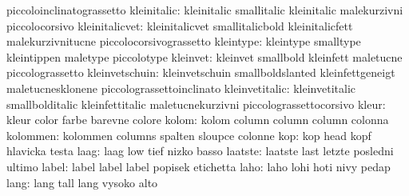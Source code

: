                            piccoloinclinatograssetto
              kleinitalic: kleinitalic               smallitalic
                           kleinitalic               malekurzivni
                           piccolocorsivo
           kleinitalicvet: kleinitalicvet            smallitalicbold
                           kleinitalicfett           malekurzivnitucne
                           piccolocorsivograssetto
                kleintype: kleintype                 smalltype
                           kleintippen               maletype
                           piccolotype               %
                 kleinvet: kleinvet                  smallbold
                           kleinfett                 maletucne
                           piccolograssetto
           kleinvetschuin: kleinvetschuin            smallboldslanted
                           kleinfettgeneigt          maletucnesklonene
                           piccolograssettoinclinato
           kleinvetitalic: kleinvetitalic            smallbolditalic
                           kleinfettitalic           maletucnekurzivni
                           piccolograssettocorsivo
                    kleur: kleur                     color
                           farbe                     barevne
                           colore
                    kolom: kolom                     column
                           column                    column
                           colonna                   %
                 kolommen: kolommen                  columns
                           spalten                   sloupce
                           colonne
                      kop: kop                       head
                           kopf                      hlavicka
                           testa                     %
                     laag: laag                      low
                           tief                      nizko
                           basso
                  laatste: laatste                   last
                           letzte                    posledni
                           ultimo
                    label: label                     label
                           label                     popisek
                           etichetta
                     laho: laho                      lohi
                           hoti                      nivy
                           pedap                     %
                     lang: lang                      tall
                           lang                      vysoko
                           alto                      %
